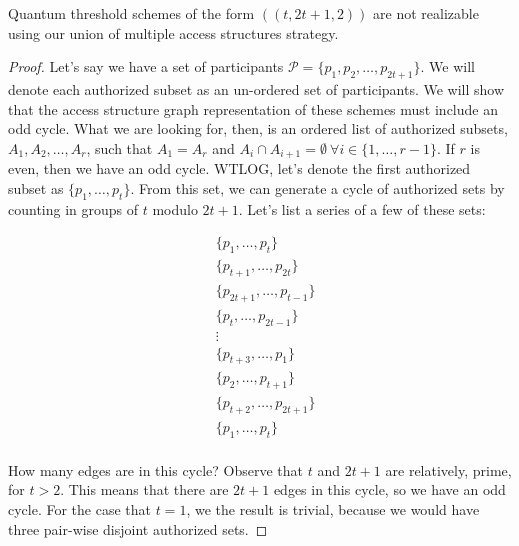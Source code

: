 \begin{theorem}
    \label{thm:t-2t+1-2}
    Quantum threshold schemes of the form $((t,2t+1,2))$ are not realizable using our union of multiple access structures strategy.
\end{theorem}
 
\begin{proof}
    Let's say we have a set of participants $\mathcal{P} = \{p_1,p_2,\dots,p_{2t+1}\}$. We will denote each authorized subset as an un-ordered set of participants. We will show that the access structure graph representation of these schemes must include an odd cycle. What we are looking for, then, is an ordered list of authorized subsets, $A_1, A_2, \dots, A_r$, such that $A_1=A_r$ and $A_i \cap A_{i+1} = \emptyset \: \forall i \in \{1,\dots,r-1\}$. If $r$ is even, then we have an odd cycle. WTLOG, let's denote the first authorized subset as $\{p_1,\dots,p_{t}\}$. From this set, we can generate a cycle of authorized sets by counting in groups of $t$ modulo $2t+1$. Let's list a series of a few of these sets:
    
    \begin{align*}
        &\{p_1,\dots,p_{t}\} \\ 
        &\{p_{t+1},\dots,p_{2t}\} \\ 
        &\{p_{2t+1},\dots,p_{t-1}\} \\ 
        &\{p_{t},\dots,p_{2t-1}\} \\
        & \vdots \\
        &\{p_{t+3},\dots,p_{1}\} \\ 
        &\{p_{2},\dots,p_{t+1}\} \\ 
        &\{p_{t+2},\dots,p_{2t+1}\} \\ 
        &\{p_1,\dots,p_{t}\} \\ 
    \end{align*}
    
    How many edges are in this cycle? Observe that $t$ and $2t+1$ are relatively, prime, for $t > 2$. This means that there are $2t+1$ edges in this cycle, so we have an odd cycle. For the case that $t=1$, we the result is trivial, because we would have three pair-wise disjoint authorized sets.
\end{proof}






